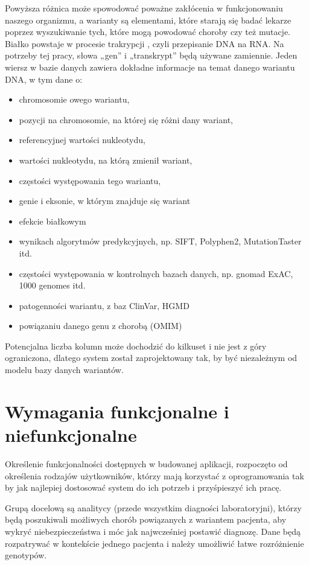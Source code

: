 \documentclass[a4paper,12pt,twoside]{article}
\begin{document}
Powyższa różnica może spowodować poważne
zakłócenia w funkcjonowaniu naszego organizmu, a warianty
są elementami, które starają się badać
lekarze poprzez wyszukiwanie tych, które mogą powodować choroby
czy też mutacje.
Białko powstaje w procesie trakrypcji \cite{transkrypcja}, czyli przepisanie DNA na RNA.
Na potrzeby tej pracy, słowa „gen” i „transkrypt” będą używane zamiennie.
Jeden wiersz w bazie danych zawiera dokładne informacje na temat danego wariantu DNA, w tym dane o:

\begin{itemize}
\item chromosomie owego wariantu,
\item pozycji na chromosomie, na której się różni dany wariant,
\item referencyjnej wartości nukleotydu,
\item wartości nukleotydu, na którą zmienił wariant,
\item częstości występowania tego wariantu,
\item genie i eksonie, w którym znajduje się wariant
\item efekcie białkowym
\item wynikach algorytmów predykcyjnych, np. SIFT, Polyphen2, MutationTaster itd.
\item częstości występowania w kontrolnych bazach danych, np. gnomad ExAC, 1000 genomes itd.
\item patogenności wariantu, z baz ClinVar, HGMD
\item powiązaniu danego genu z chorobą (OMIM)
\end{itemize}

Potencjalna liczba kolumn może dochodzić do kilkuset
i nie jest z góry ograniczona, dlatego system został zaprojektowany tak, by być niezależnym od modelu bazy danych wariantów.
\newpage
\section{Wymagania funkcjonalne i niefunkcjonalne}

Określenie funkcjonalności dostępnych w budowanej aplikacji, rozpoczęto od określenia
rodzajów użytkowników, którzy mają korzystać z oprogramowania tak by jak najlepiej dostosować system do ich potrzeb i przyśpieszyć ich pracę.

Grupą docelową są analitycy (przede wszystkim diagności laboratoryjni), którzy będą poszukiwali możliwych chorób powiązanych z wariantem pacjenta, aby wykryć niebezpieczeństwa i móc jak najwcześniej postawić diagnozę.
Dane będą rozpatrywać w kontekście jednego pacjenta i należy umożliwić łatwe rozróżnienie genotypów.
\end{document}
